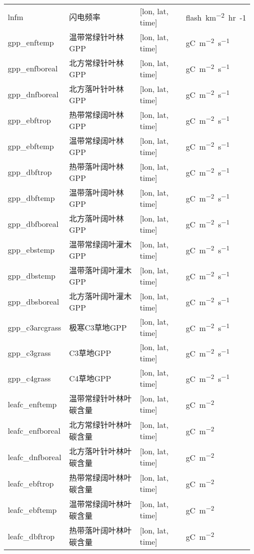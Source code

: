 {\begin{longtable}[htbp]{lp{}ll}
lnfm & 闪电频率 & {[}lon, lat, time{]} & \unit{flash.km^{-2}.hr{-1}} \\
gpp\_enftemp & 温带常绿针叶林GPP & {[}lon, lat, time{]} & \unit{gC.m^{-2}.s^{-1}} \\
gpp\_enfboreal & 北方常绿针叶林GPP & {[}lon, lat, time{]} & \unit{gC.m^{-2}.s^{-1}} \\
gpp\_dnfboreal & 北方落叶针叶林GPP & {[}lon, lat, time{]} & \unit{gC.m^{-2}.s^{-1}} \\
gpp\_ebftrop & 热带常绿阔叶林GPP & {[}lon, lat, time{]} & \unit{gC.m^{-2}.s^{-1}} \\
gpp\_ebftemp & 温带常绿阔叶林GPP & {[}lon, lat, time{]} & \unit{gC.m^{-2}.s^{-1}} \\
gpp\_dbftrop & 热带落叶阔叶林GPP & {[}lon, lat, time{]} & \unit{gC.m^{-2}.s^{-1}} \\
gpp\_dbftemp & 温带落叶阔叶林GPP & {[}lon, lat, time{]} & \unit{gC.m^{-2}.s^{-1}} \\
gpp\_dbfboreal & 北方落叶阔叶林GPP & {[}lon, lat, time{]} & \unit{gC.m^{-2}.s^{-1}} \\
gpp\_ebstemp & 温带常绿阔叶灌木GPP & {[}lon, lat, time{]} & \unit{gC.m^{-2}.s^{-1}} \\
gpp\_dbstemp & 温带落叶阔叶灌木GPP & {[}lon, lat, time{]} & \unit{gC.m^{-2}.s^{-1}} \\
gpp\_dbsboreal & 北方落叶阔叶灌木GPP & {[}lon, lat, time{]} & \unit{gC.m^{-2}.s^{-1}} \\
gpp\_c3arcgrass & 极寒C3草地GPP & {[}lon, lat, time{]} & \unit{gC.m^{-2}.s^{-1}} \\
gpp\_c3grass & C3草地GPP & {[}lon, lat, time{]} & \unit{gC.m^{-2}.s^{-1}} \\
gpp\_c4grass & C4草地GPP & {[}lon, lat, time{]} & \unit{gC.m^{-2}.s^{-1}} \\
leafc\_enftemp & 温带常绿针叶林叶碳含量 & {[}lon, lat, time{]} & \unit{gC.m^{-2}} \\
leafc\_enfboreal & 北方常绿针叶林叶碳含量 & {[}lon, lat, time{]} & \unit{gC.m^{-2}} \\
leafc\_dnfboreal & 北方落叶针叶林叶碳含量 & {[}lon, lat, time{]} & \unit{gC.m^{-2}} \\
leafc\_ebftrop & 热带常绿阔叶林叶碳含量 & {[}lon, lat, time{]} & \unit{gC.m^{-2}} \\
leafc\_ebftemp & 温带常绿阔叶林叶碳含量 & {[}lon, lat, time{]} & \unit{gC.m^{-2}} \\
leafc\_dbftrop & 热带落叶阔叶林叶碳含量 & {[}lon, lat, time{]} & \unit{gC.m^{-2}} \\

\end{longtable}}

